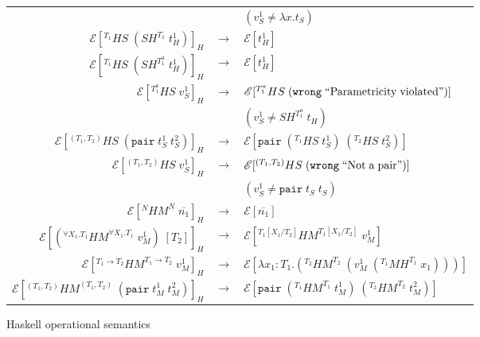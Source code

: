 \begin{figure}
\begin{tabular}{rcl}
&& $(v_{S}^{1}\neq\lambda x.t_{S})$ \\
$\mathscr{E}[^{T_{1}}HS\;(SH^{T_{1}}\;t_{H}^{1})]_{H}$ & $\rightarrow$ & $\mathscr{E}[t_{H}^{1}]$ \\
$\mathscr{E}[^{T_{1}}HS\;(SH^{T^{a}_{1}}\;t_{H}^{1})]_{H}$ & $\rightarrow$ & $\mathscr{E}[t_{H}^{1}]$ \\
$\mathscr{E}[^{T^{a}_{1}}HS\;v_{S}^{1}]_{H}$ & $\rightarrow$ & $\mathscr{E}[^{T^{a}_{1}}HS\;(\mathtt{wrong}\;\mathrm{``Parametricity\;violated"})]$ \\
&& $(v_{S}^{1}\neq SH^{T^{a}_{1}}\;t_{H})$ \\
$\mathscr{E}[^{(T_{1},T_{2})}HS\;(\mathtt{pair}\;t_{S}^{1}\;t_{S}^{2})]_{H}$ & $\rightarrow$ & $\mathscr{E}[\mathtt{pair}\;(^{T_{1}}HS\;t_{S}^{1})\;(^{T_{2}}HS\;t_{S}^{2})]$ \\
$\mathscr{E}[^{(T_{1},T_{2})}HS\;v_{S}^{1}]_{H}$ & $\rightarrow$ & $\mathscr{E}[^{(T_{1},T_{2})}HS\;(\mathtt{wrong}\;\mathrm{``Not\;a\;pair"})]$ \\
&& $(v_{S}^{1}\neq\mathtt{pair}\;t_{S}\;t_{S})$ \\
$\mathscr{E}[^{N}HM^{N}\;\overline{n_{1}}]_{H}$ & $\rightarrow$ & $\mathscr{E}[\overline{n_{1}}]$ \\
$\mathscr{E}[(^{\forall X_{1}.T_{1}}HM^{\forall X_{1}.T_{1}}\;v_{M}^{1})\;[T_{2}]]_{H}$ & $\rightarrow$ & $\mathscr{E}[^{T_{1}[X_{1}/T_{2}]}HM^{T_{1}[X_{1}/T_{2}]}\;v_{M}^{1}]$ \\
$\mathscr{E}[^{T_{1}\rightarrow T_{2}}HM^{T_{1}\rightarrow T_{2}}\;v_{M}^{1}]_{H}$ & $\rightarrow$ & $\mathscr{E}[\lambda x_{1}:T_{1}.(^{T_{2}}HM^{T_{2}}\;(v_{M}^{1}\;(^{T_{1}}MH^{T_{1}}\;x_{1})))]$ \\
$\mathscr{E}[^{(T_{1},T_{2})}HM^{(T_{1},T_{2})}\;(\mathtt{pair}\;t_{M}^{1}\;t_{M}^{2})]_{H}$ & $\rightarrow$ & $\mathscr{E}[\mathtt{pair}\;(^{T_{1}}HM^{T_{1}}\;t_{M}^{1})\;(^{T_{2}}HM^{T_{2}}\;t_{M}^{2})]$ \\
\end{tabular}
\caption{Haskell operational semantics}
\label{fig:hos}
\end{figure}